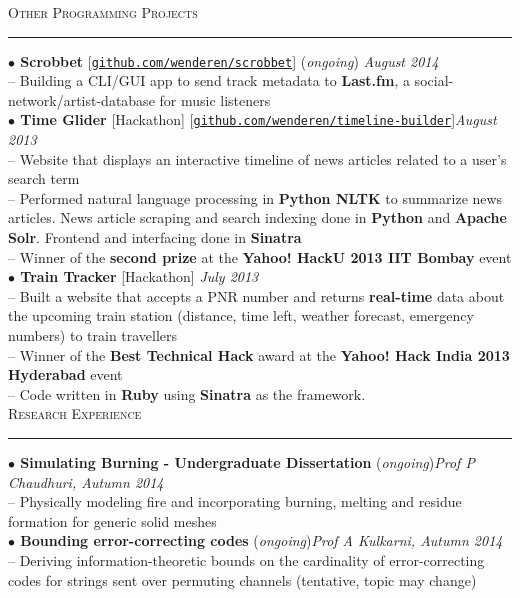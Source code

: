 \documentclass[a4paper,9pt]{article}
\begin{document}
\Large{\textsc{Other Programming Projects}}\vspace{1.5pt}
\hrule\vspace{0.25cm}
\small
\textbf{$\bullet$ Scrobbet} [\href{https://github.com/wenderen/scrobbet}{\texttt{github.com/wenderen/scrobbet}}] (\textit{ongoing}) \hfill \textit{August 2014}\\
-- Building a CLI/GUI app to send track metadata to \textbf{Last.fm}, a social-network/artist-database for music listeners\\
\textbf{$\bullet$ Time Glider} [Hackathon] [\href{https://github.com/wenderen/timeline-builder}{\texttt{github.com/wenderen/timeline-builder}}]\hfill \textit{August 2013}\\
-- Website that displays an interactive timeline of news articles related to a user's search term\\
-- Performed natural language processing in \textbf{Python NLTK} to summarize news articles. News article scraping and search indexing done in \textbf{Python} and \textbf{Apache Solr}. Frontend and interfacing done in \textbf{Sinatra}\\
-- Winner of the \textbf{second prize} at the \textbf{Yahoo! HackU 2013 IIT Bombay} event\\
\textbf{$\bullet$ Train Tracker} [Hackathon] \hfill \textit{July 2013}\\
-- Built a website that accepts a PNR number and returns \textbf{real-time} data about the upcoming train station (distance, time left, weather forecast, emergency numbers) to train travellers\\
-- Winner of the \textbf{Best Technical Hack} award at the \textbf{Yahoo! Hack India 2013 Hyderabad} event\\
-- Code written in \textbf{Ruby} using \textbf{Sinatra} as the framework.\\

\Large{\textsc{Research Experience}}\vspace{1.5pt}
\hrule\vspace{0.25cm}
\small
\textbf{$\bullet$ Simulating Burning - Undergraduate Dissertation} (\textit{ongoing})\hfill \textit{Prof P Chaudhuri, Autumn 2014}\\
-- Physically modeling fire and incorporating burning, melting and residue formation for generic solid meshes\\
\textbf{$\bullet$ Bounding error-correcting codes} (\textit{ongoing})\hfill \textit{Prof A Kulkarni, Autumn 2014}\\
-- Deriving information-theoretic bounds on the cardinality of error-correcting codes for strings sent over permuting channels (tentative, topic may change)\\
\end{document}
